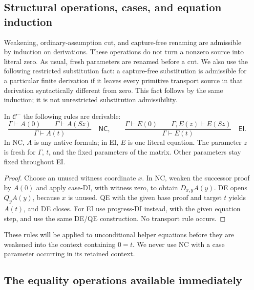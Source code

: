 \subsection{Structural operations, cases, and equation induction}

Weakening, ordinary-assumption cut, and capture-free renaming are
admissible by induction on derivations. These operations do not turn a
nonzero source into literal zero. As usual, fresh parameters are renamed
before a cut. We also use the following restricted substitution fact:
a capture-free substitution is admissible for a particular finite
derivation if it leaves every primitive transport source in that
derivation syntactically different from zero. This fact follows by the
same induction; it is not unrestricted substitution admissibility.

\begin{lemma}
\label{zs:cases-induction}
In $\mathcal C^{-}$ the following rules are derivable:
\[
 \frac{\Gamma\vdash A(0)\qquad\Gamma\vdash A(Sz)}
      {\Gamma\vdash A(t)}\quad\mathsf{NC},
 \qquad
 \frac{\Gamma\vdash E(0)\qquad\Gamma,E(z)\vdash E(Sz)}
      {\Gamma\vdash E(t)}\quad\mathsf{EI}.
\]
In NC, $A$ is any native formula; in EI, $E$ is one literal equation.
The parameter $z$ is fresh for $\Gamma$, $t$, and the fixed parameters
of the matrix. Other parameters stay fixed throughout EI.
\end{lemma}
\begin{proof}
Choose an unused witness coordinate $x$. In NC, weaken the successor
proof by $A(0)$ and apply case-DI, with witness zero, to obtain
$D_{x,y}A(y)$. DE opens $Q_yA(y)$, because $x$ is unused. QE with the
given base proof and target $t$ yields $A(t)$, and DE closes.
For EI use progress-DI instead, with the given equation step, and use
the same DE/QE construction. No transport rule occurs.
\end{proof}

These rules will be applied to unconditional helper equations before
they are weakened into the context containing $0=t$. We never use NC
with a case parameter occurring in its retained context.

\subsection{The equality operations available immediately}

